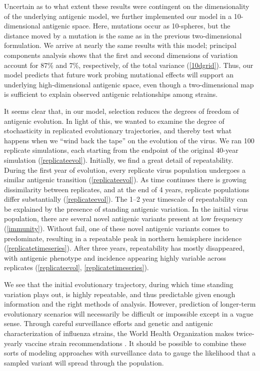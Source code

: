 Uncertain as to what extent these results were contingent on the dimensionality of the underlying antigenic model, we further implemented our model in a 10-dimensional antigenic space.  Here, mutations occur as 10-spheres, but the distance moved by a mutation is the same as in the previous two-dimensional formulation.  We arrive at nearly the same results with this model; principal components analysis shows that the first and second dimensions of variation account for 87\% and 7\%, respectively, of the total variance (\ref{10dgrid}).  Thus, our model predicts that future work probing mutational effects will support an underlying high-dimensional antigenic space, even though a two-dimensional map is sufficient to explain observed antigenic relationships among strains.

It seems clear that, in our model, selection reduces the degrees of freedom of antigenic evolution.  In light of this, we wanted to examine the degree of stochasticity in replicated evolutionary trajectories, and thereby test what happens when we ``wind back the tape'' \cite{GouldWonderfulLife} on the evolution of the virus.  We ran 100 replicate simulations, each starting from the endpoint of the original 40-year simulation (\ref{replicateevol}).  Initially, we find a great detail of repeatability.  During the first year of evolution, every replicate virus population undergoes a similar antigenic transition (\ref{replicateevol}).  As time continues there is growing dissimilarity between replicates, and at the end of 4 years, replicate populations differ substantially (\ref{replicateevol}).  The 1--2 year timescale of repeatability can be explained by the presence of standing antigenic variation.  In the initial virus population, there are several novel antigenic variants present at low frequency (\ref{immunity}).  Without fail, one of these novel antigenic variants comes to predominate, resulting in a repeatable peak in northern hemisphere incidence (\ref{replicatetimeseries}).  After three years, repeatability has mostly disappeared, with antigenic phenotype and incidence appearing highly variable across replicates (\ref{replicateevol}, \ref{replicatetimeseries}).

We see that the initial evolutionary trajectory, during which time standing variation plays out, is highly repeatable, and thus predictable given enough information and the right methods of analysis.  However, prediction of longer-term evolutionary scenarios will necessarily be difficult or impossible except in a vague sense.  Through careful surveillance efforts and genetic and antigenic characterization of influenza strains, the World Health Organization makes twice-yearly vaccine strain recommendations \cite{Barr10}.  It should be possible to combine these sorts of modeling approaches with surveillance data to gauge the likelihood that a sampled variant will spread through the population.

